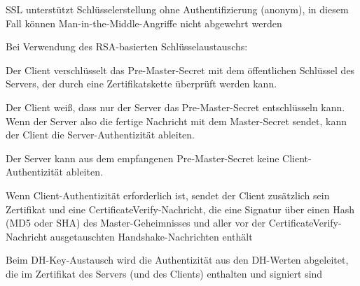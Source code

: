 \documentclass[a4paper]{article}
\begin{document}
\begin{multicols}{3}
\begin{itemize*}
\begin{itemize*}
                  \item SSL unterstützt Schlüsselerstellung ohne Authentifizierung (anonym), in diesem Fall können Man-in-the-Middle-Angriffe nicht abgewehrt werden
                  \item Bei Verwendung des RSA-basierten Schlüsselaustauschs:
                  \begin{itemize*}
                        \item Der Client verschlüsselt das Pre-Master-Secret mit dem öffentlichen Schlüssel des Servers, der durch eine Zertifikatskette überprüft werden kann.
                        \item Der Client weiß, dass nur der Server das Pre-Master-Secret entschlüsseln kann. Wenn der Server also die fertige Nachricht mit dem Master-Secret sendet, kann der Client die Server-Authentizität ableiten.
                        \item Der Server kann aus dem empfangenen Pre-Master-Secret keine Client-Authentizität ableiten.
                        \item Wenn Client-Authentizität erforderlich ist, sendet der Client zusätzlich sein Zertifikat und eine CertificateVerify-Nachricht, die eine Signatur über einen Hash (MD5 oder SHA) des Master-Geheimnisses und aller vor der CertificateVerify-Nachricht ausgetauschten Handshake-Nachrichten enthält
                  \end{itemize*}
                  \item Beim DH-Key-Austausch wird die Authentizität aus den DH-Werten abgeleitet, die im Zertifikat des Servers (und des Clients) enthalten und signiert sind
            \end{itemize*}
      \end{itemize*}


\end{multicols}
\end{document}
